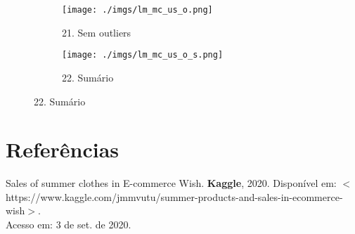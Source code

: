\documentclass[12pt, a4paper]{article}
\begin{document}
\FloatBarrier
\begin{figure}[h]
  \begin{subfigure}[b]{0.4\textwidth}
    \texttt{[image: ./imgs/lm\_mc\_us\_o.png]}
    \caption*{21. Sem outliers}
    \label{fig:1}
  \end{subfigure}
  \begin{subfigure}[b]{0.5\textwidth}
    \texttt{[image: ./imgs/lm\_mc\_us\_o\_s.png]}
    \caption*{22. Sumário}
    \label{fig:2}
  \end{subfigure}
\end{figure}
\FloatBarrier 

\begin{comment}
\FloatBarrier
\begin{figure}[h]
\texttt{[image: ./imgs/lm\_us\_rc\_img.png]}
\caption*{Figura 3: Regressão Rating C e Units Sold}
\end{figure}
\FloatBarrier 
\end{comment}

\section{Referências}  
       
   	Sales of summer clothes in E-commerce Wish. \textbf{Kaggle}, 2020. Disponível em: $<$https://www.kaggle.\/\/com/jmmvutu/summer-products-and-sales-in-ecommerce-wish$>$.\\Acesso em: 3 de set. de 2020.
\end{document}
